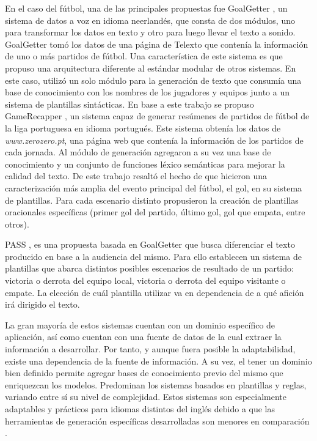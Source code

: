 En el caso del fútbol, una de las principales propuestas fue GoalGetter , un sistema de datos a voz en idioma neerlandés, que consta de dos módulos, uno para transformar los datos en texto y 
otro para luego llevar el texto a sonido. GoalGetter tomó los datos de una página de Telexto que contenía la información de uno o más partidos de fútbol. Una característica de este sistema es que propuso una arquitectura diferente al 
estándar modular de otros sistemas. En este caso, utilizó un solo módulo para la generación de texto que consumía una base de conocimiento con los nombres de los jugadores y equipos junto a un sistema de plantillas sintácticas.
En base a este trabajo se propuso GameRecapper , un sistema capaz de generar resúmenes de partidos de fútbol de la liga portuguesa en idioma portugués. Este sistema obtenía los datos de \textit{www.zerozero.pt},
una página web que contenía la información de los partidos de cada jornada. Al módulo de generación agregaron a su vez una base de conocimiento y un conjunto de funciones léxico semánticas para mejorar la calidad del texto. De este trabajo resaltó el hecho 
de que hicieron una caracterización más amplia del evento principal del fútbol, el gol, en su sistema de plantillas. Para cada escenario distinto propusieron la creación de plantillas oracionales específicas (primer gol del partido, último gol, gol que empata, entre otros).

PASS , es una propuesta basada en GoalGetter que busca diferenciar el texto producido en base a la audiencia del mismo. Para ello establecen un sistema de plantillas que abarca distintos posibles escenarios de resultado de un partido: victoria o derrota 
del equipo local, victoria o derrota del equipo visitante o empate. La elección de cuál plantilla utilizar va en dependencia de a qué afición irá dirigido el texto.  

    La gran mayoría de estos sistemas cuentan con un dominio específico de aplicación, así como cuentan con una fuente de datos de la 
cual extraer la información a desarrollar. Por tanto, y aunque fuera posible la adaptabilidad, existe una dependencia de la fuente de información. A su vez, el tener un dominio bien definido  
permite agregar bases de conocimiento previo del mismo que enriquezcan los modelos. Predominan los sistemas basados en plantillas y reglas, variando entre sí su nivel de complejidad. Estos 
sistemas son especialmente adaptables y prácticos para idiomas distintos del inglés debido a que las herramientas de generación específicas desarrolladas son menores en comparación . 

